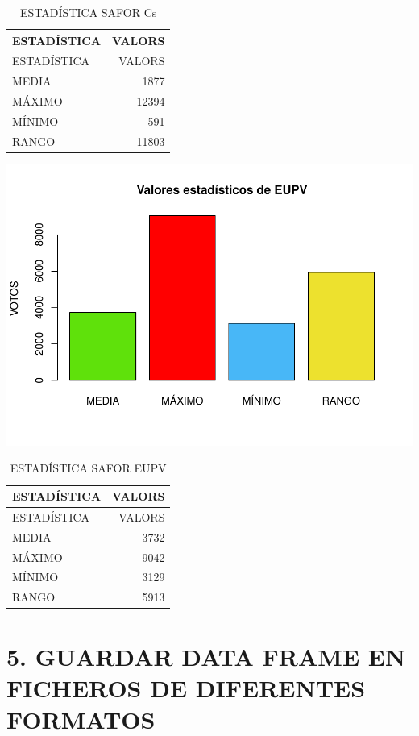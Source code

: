 \documentclass[
]{article}
\begin{document}
\begin{longtable}[]{@{}lr@{}}
\caption{ESTADÍSTICA SAFOR Cs}\tabularnewline
\toprule\noalign{}
ESTADÍSTICA & VALORS \\
\midrule\noalign{}
\endfirsthead
\toprule\noalign{}
ESTADÍSTICA & VALORS \\
\midrule\noalign{}
\endhead
\bottomrule\noalign{}
\endlastfoot
MEDIA & 1877 \\
MÁXIMO & 12394 \\
MÍNIMO & 591 \\
RANGO & 11803 \\
\end{longtable}

\includegraphics{SAFOR_files/figure-latex/6-7.pdf}

\begin{longtable}[]{@{}lr@{}}
\caption{ESTADÍSTICA SAFOR EUPV}\tabularnewline
\toprule\noalign{}
ESTADÍSTICA & VALORS \\
\midrule\noalign{}
\endfirsthead
\toprule\noalign{}
ESTADÍSTICA & VALORS \\
\midrule\noalign{}
\endhead
\bottomrule\noalign{}
\endlastfoot
MEDIA & 3732 \\
MÁXIMO & 9042 \\
MÍNIMO & 3129 \\
RANGO & 5913 \\
\end{longtable}

\hypertarget{guardar-data-frame-en-ficheros-de-diferentes-formatos}{%
\section{5. GUARDAR DATA FRAME EN FICHEROS DE DIFERENTES
FORMATOS}\label{guardar-data-frame-en-ficheros-de-diferentes-formatos}}
\end{document}
